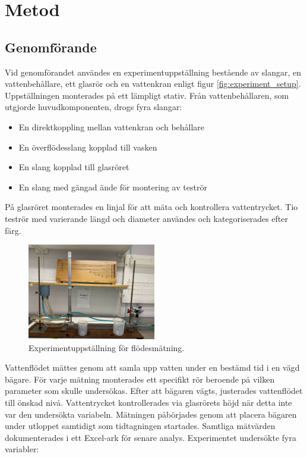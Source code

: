 \documentclass[a4paper,12pt]{article}
\begin{document}
\section{Metod}
\subsection{Genomförande}
\noindent
Vid genomförandet användes en experimentuppställning bestående av slangar, 
en vattenbehållare, ett glasrör och en vattenkran enligt figur \ref{fig:experiment_setup}. 
Uppställningen monterades på ett lämpligt stativ. Från vattenbehållaren, som utgjorde 
huvudkomponenten, drogs fyra slangar:
%
\begin{itemize}
    \item En direktkoppling mellan vattenkran och behållare
    \item En överflödesslang kopplad till vasken
    \item En slang kopplad till glasröret
    \item En slang med gängad ände för montering av teströr
\end{itemize}
%
På glasröret monterades en linjal för att mäta och kontrollera vattentrycket. 
Tio teströr med varierande längd och diameter användes och kategoriserades efter färg.
%
\begin{figure}[ht]
    \centering
    \includegraphics[width=0.5\textwidth]{Labb-yta.jpg}
    \caption{Experimentuppställning för flödesmätning.}
\end{figure}
%
\noindent
Vattenflödet mättes genom att samla upp vatten under en bestämd tid i en vägd bägare. 
För varje mätning monterades ett specifikt rör beroende på vilken parameter som skulle 
undersökas. Efter att bägaren vägts, justerades vattenflödet till önskad nivå. 
Vattentrycket kontrollerades via glasrörets höjd när detta inte var den undersökta 
variabeln.
%
Mätningen påbörjades genom att placera bägaren under utloppet samtidigt som 
tidtagningen startades. Samtliga mätvärden dokumenterades i ett Excel-ark för 
senare analys. Experimentet undersökte fyra variabler:
\end{document}
